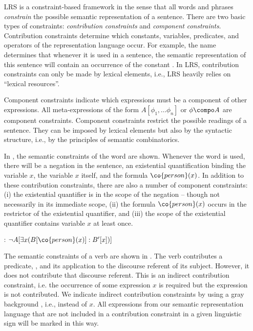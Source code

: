 \documentclass[output=paper]{langsci/langscibook}
\begin{document}
LRS is a constraint-based framework in the sense that all words and phrases \emph{constrain} the possible semantic representation of a sentence. 
There are two basic types of constraints: \emph{contribution constraints} and \emph{component constraints}. 
Contribution constraints determine which constants, variables, predicates, and operators of the representation language occur. 
For example, the name  determines that whenever it is used in a sentence, the semantic representation of this sentence will contain an occurrence of the constant . In LRS, contribution constraints can only be made by lexical elements, i.e., LRS heavily relies on ``lexical resources''.

Component constraints indicate which expressions must be a component of other expressions. All meta-expressions of the form $A[\phi_1, \ldots \phi_n]$ or $\phi \compo A$ are component constraints. 
Component constraints restrict the possible readings of a sentence. They can be imposed by lexical elements but also by the syntactic structure, i.e., by the principles of semantic combinatorics.

In , the semantic constraints of the word  are shown. Whenever the word is used, there will be a negation in the sentence, an existential quantification binding the variable $x$, the variable $x$ itself, and the formula $\co{person}(x)$. In addition to these contribution constraints, there are also a number of component constraints: (i) the existential quantifier is in the scope of the negation -- though not necessarily in its immediate scope, (ii) the formula $\co{person}(x)$ occurs in the restrictor of the existential quantifier, and (iii) the scope of the existential quantifier contains variable $x$ at least once.

\ea \label{le-niemand}
: $\lnot A[\exists x (B[\co{person}(x)] : B'[x])]$
\z

The semantic constraints of a verb are shown in . The verb contributes a predicate, , and its application to the discourse referent of its subject. However, it
does not contribute that discourse referent. This is an indirect contribution constraint, i.e. the occurrence of some expression $x$ is required but the expression is not contributed. 
We indicate indirect contribution constraints 
by using a gray background%
, i.e.,  instead of $x$.
All expressions from our semantic representation language that are not included in a contribution constraint in a given linguistic sign will be marked in this way.
\end{document}
